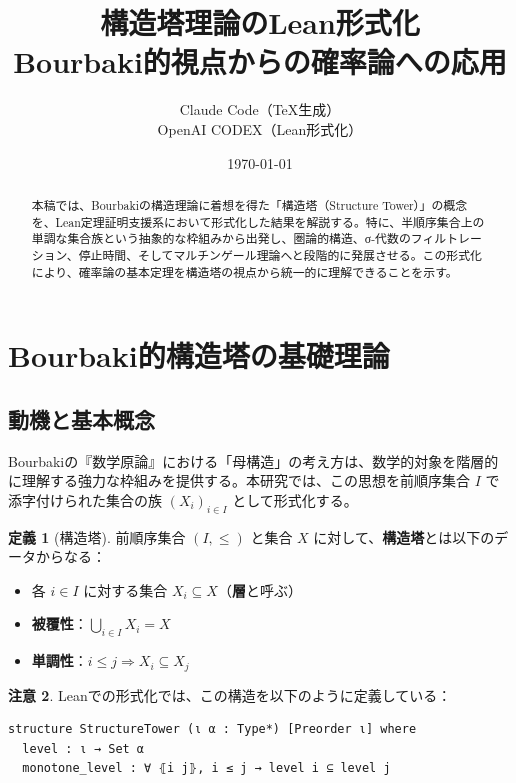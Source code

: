 \documentclass[a4paper,12pt]{article}
\title{構造塔理論のLean形式化\\
Bourbaki的視点からの確率論への応用}
\author{Claude Code（TeX生成）\\
OpenAI CODEX（Lean形式化）}
\date{\today}
\theoremstyle{definition}
\newtheorem{definition}{定義}[section]
\newtheorem{remark}[definition]{注意}
\begin{document}
\maketitle

\begin{abstract}
本稿では、Bourbakiの構造理論に着想を得た「構造塔（Structure Tower）」の概念を、Lean定理証明支援系において形式化した結果を解説する。特に、半順序集合上の単調な集合族という抽象的な枠組みから出発し、圏論的構造、σ-代数のフィルトレーション、停止時間、そしてマルチンゲール理論へと段階的に発展させる。この形式化により、確率論の基本定理を構造塔の視点から統一的に理解できることを示す。
\end{abstract}

\tableofcontents

\section{Bourbaki的構造塔の基礎理論}

\subsection{動機と基本概念}

Bourbakiの『数学原論』における「母構造」の考え方は、数学的対象を階層的に理解する強力な枠組みを提供する。本研究では、この思想を前順序集合 $I$ で添字付けられた集合の族 $(X_i)_{i \in I}$ として形式化する。

\begin{definition}[構造塔]\label{def:structure-tower}
前順序集合 $(I, \leq)$ と集合 $X$ に対して、\textbf{構造塔}とは以下のデータからなる：
\begin{itemize}
\item 各 $i \in I$ に対する集合 $X_i \subseteq X$（\textbf{層}と呼ぶ）
\item \textbf{被覆性}：$\bigcup_{i \in I} X_i = X$
\item \textbf{単調性}：$i \leq j \Rightarrow X_i \subseteq X_j$
\end{itemize}
\end{definition}

\begin{remark}
Leanでの形式化では、この構造を以下のように定義している：
\begin{verbatim}
structure StructureTower (ι α : Type*) [Preorder ι] where
  level : ι → Set α
  monotone_level : ∀ ⦃i j⦄, i ≤ j → level i ⊆ level j
\end{verbatim}
\end{remark}
\end{document}
